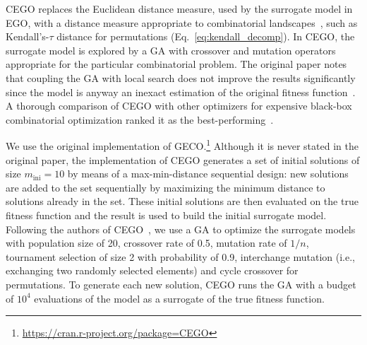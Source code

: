 \documentclass[sigconf,dvipsnames]{acmart}
\newcommand{\minit}{\ensuremath{m_\text{ini}}\xspace}
\newcommand{\FEmax}{\ensuremath{m}}
\begin{document}
CEGO replaces the Euclidean distance measure, used by the surrogate model in
EGO, with a distance measure appropriate to combinatorial
landscapes~\citep{ZaeStoBar2014:ppsn}, such as Kendall's-$\tau$ distance for
permutations (Eq.~\ref{eq:kendall_decomp}). In CEGO, the surrogate model is
explored by a GA with crossover and mutation operators appropriate for the
particular combinatorial problem. The original paper notes that coupling the GA
with local search does not improve the results significantly since the model is
anyway an inexact estimation of the original fitness
function~\citep[p.~875]{ZaeStoFriFisNauBar2014}. A thorough comparison of CEGO
with other optimizers for expensive black-box combinatorial optimization ranked
it as the best-performing~\citep{ZaeStoFriFisNauBar2014}.




We use the original implementation of GECO.\footnote{\url{https://cran.r-project.org/package=CEGO}} %
Although it is never stated in the original paper, the implementation of CEGO
generates a set of initial solutions of size $\minit=10$ by means of a
max-min-distance sequential design: new solutions are added to the set
sequentially by maximizing the minimum distance to solutions already in the
set. These initial solutions are then evaluated on the true fitness function
and the result is used to build the initial surrogate
model. %
Following the authors of
CEGO~\citep{ZaeStoFriFisNauBar2014,ZaeStoBar2014:ppsn}, we use a GA to optimize
the surrogate models with population size of 20, crossover rate of 0.5,
mutation rate of $1/n$, tournament selection of size 2 with probability of 0.9,
interchange mutation (i.e., exchanging two randomly selected elements) and
cycle crossover for permutations. To generate each new solution, CEGO runs the
GA with a budget of $10^4$ evaluations of the model as a surrogate of the true fitness function.  
\end{document}
